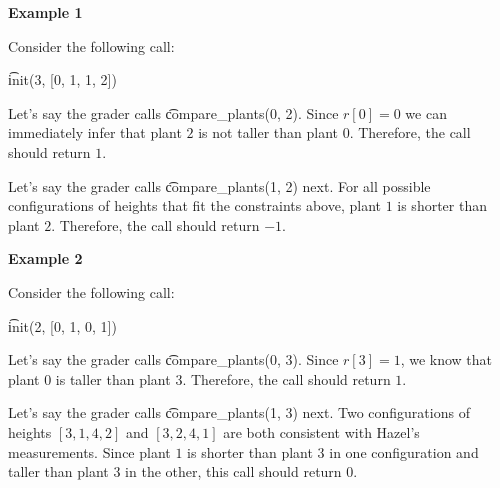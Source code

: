 \textbf{Example 1}

Consider the following call:

\t{init(3, [0, 1, 1, 2])}

Let's say the grader calls \t{compare\_plants(0, 2)}. Since $r[0] = 0$ we can immediately infer that plant $2$ is not taller than plant $0$. Therefore, the call should return $1$.

Let's say the grader calls \t{compare\_plants(1, 2)} next. For all possible configurations of heights that fit the constraints above, plant $1$ is shorter than plant $2$.  Therefore, the call should return $-1$.

\textbf{Example 2}

Consider the following call:

\t{init(2, [0, 1, 0, 1])}

Let's say the grader calls \t{compare\_plants(0, 3)}. Since $r[3] = 1$, we know that plant $0$ is taller than plant $3$. Therefore, the call should return $1$.

Let's say the grader calls \t{compare\_plants(1, 3)} next. Two configurations of heights $[3,1,4,2]$ and $[3,2,4,1]$ are both consistent with Hazel's measurements. Since plant $1$ is shorter than plant $3$ in one configuration and taller than plant $3$ in the other, this call should return $0$.
